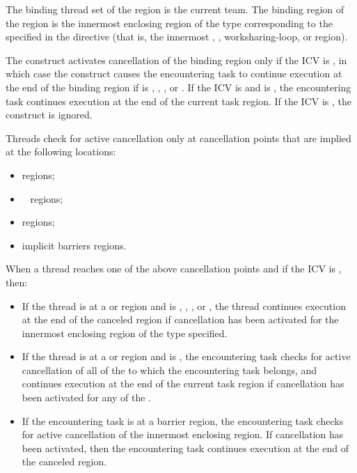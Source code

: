 \binding
The binding thread set of the  region is the current team.
The binding region of the  region is the innermost enclosing 
region of the type corresponding to the 
specified in the directive (that is, the innermost , 
, worksharing-loop, or  region).

\descr
The  construct activates cancellation of the binding region 
only if the  ICV is , in which case the  
construct causes the encountering task to continue execution at the end of the 
binding region if  is , , 
, or . If the  ICV is  and 
 is , the encountering task 
continues execution at the end of the current task region. If the 
 ICV is , the  construct is ignored.

Threads check for active cancellation only at cancellation points that are
implied at the following locations:

\begin{itemize}
\item {} regions;
\item {}~ regions;
\item {} regions;
\item implicit barriers regions.
\end{itemize}

When a thread reaches one of the above cancellation points and if the 
 ICV is ,  then: 

\begin{itemize}
\item If the thread is at a  or  region
      and  is , , , 
      or , the thread continues execution at the end of the canceled
      region if cancellation has been activated for the innermost enclosing region
      of the type specified.
\item If the thread is at a  or  region
      and  is , the encountering task
      checks for active cancellation of all of the  to which
      the encountering task belongs, and continues execution at the end of the
      current task region if cancellation has been activated for any of 
      the .
\item If the encountering task is at a barrier region, the encountering task
      checks for active cancellation of the innermost enclosing 
      region. If cancellation has been activated, then the encountering task
      continues execution at the end of the canceled region.
\end{itemize}

